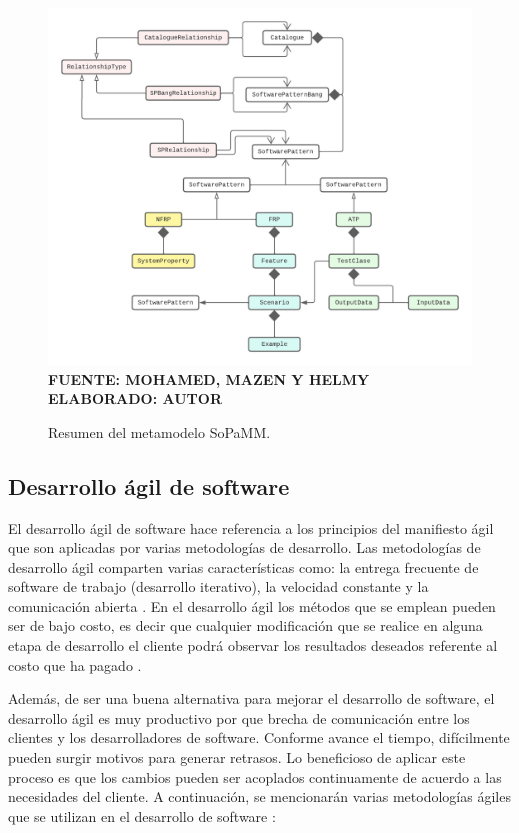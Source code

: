 \begin{figure}[h!]
	\centering
	\caption{Resumen del metamodelo SoPaMM.}
	\includegraphics[width=14cm]{img/metamodelo_sopamm.png}
	\label{fig:metamodelo_sopamm}
	\vspace{4mm}
	{\footnotesize \textbf{\\ FUENTE: MOHAMED, MAZEN Y HELMY \cite{Mohamed} \\ ELABORADO: AUTOR}}
\end{figure}


\subsection{Desarrollo ágil de software}
\sloppy
El desarrollo ágil de software hace referencia a los principios del manifiesto ágil que son aplicadas por varias metodologías de desarrollo. Las metodologías de desarrollo ágil comparten varias características como: la entrega frecuente de software de trabajo (desarrollo iterativo), la velocidad constante y la comunicación abierta \cite{Whiting2022}. En el desarrollo ágil los métodos que se emplean pueden ser de bajo costo, es decir que cualquier modificación que se realice en alguna etapa de desarrollo el cliente podrá observar los resultados deseados referente al costo que ha pagado \cite{Shafiq2018}.

Además, de ser una buena alternativa para mejorar el desarrollo de software, el desarrollo ágil es muy productivo por que brecha de comunicación entre los clientes y los desarrolladores de software. Conforme avance el tiempo, difícilmente pueden surgir motivos para generar retrasos. Lo beneficioso de aplicar este proceso es que los cambios pueden ser acoplados continuamente de acuerdo a las necesidades del cliente. A continuación, se mencionarán varias metodologías ágiles que se utilizan en el desarrollo de software \cite{Shafiq2018}:

